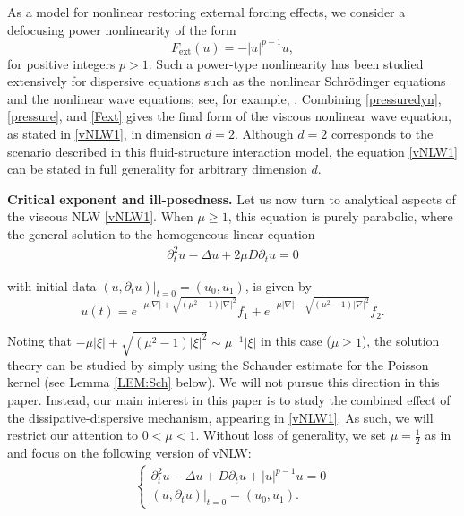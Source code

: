 \documentclass[letterpaper, 11pt,  reqno]{amsart}
\newcommand{\1}{\hspace{0.5mm}\text{I}\hspace{0.2mm}}
\newcommand{\noi}{\noindent}
\newcommand{\nb}{\nabla}
\newcommand{\Dl}{\Delta}
\newcommand{\dt}{\partial_t}
\numberwithin{equation}{section}
\numberwithin{theorem}{section}
\begin{document}
As a model for nonlinear restoring external forcing effects, we consider a defocusing power nonlinearity of the form
\begin{equation}\label{Fext}
F_{\text{ext}}(u) = -|u|^{p - 1} u,
\end{equation}
for positive integers $p > 1$.
Such a power-type nonlinearity has been studied extensively 
for dispersive equations
 such as the nonlinear Schr\"{o}dinger equations and the nonlinear wave equations; see, for example, \cite{TAO}. Combining \eqref{pressuredyn}, \eqref{pressure}, and \eqref{Fext} gives the final form of the viscous nonlinear wave equation, as stated in \eqref{vNLW1}, in dimension $d = 2$. Although $d = 2$ corresponds 
 to the scenario described in this fluid-structure interaction model, the equation \eqref{vNLW1} can be stated in full generality for arbitrary dimension $d$. 


\medskip

{\bf{Critical exponent and ill-posedness.}} Let us now turn to analytical aspects of the viscous NLW \eqref{vNLW1}.
When $\mu \geq 1$, this equation is purely parabolic, 
where the general solution to the homogeneous linear equation
\begin{align*}
\dt^2 u - \Dl  u  + 2\mu D \dt u  = 0
\end{align*}

\noi
with initial data $(u, \partial_{t}u)|_{t = 0} = (u_{0}, u_{1})$, is given by 
\[ u(t) =  e^{-\mu|\nb| + \sqrt{(\mu^2 - 1) |\nb|^2}}
f_1 + e^{-\mu|\nb| - \sqrt{(\mu^2 - 1) |\nb|^2}} f_2.
\]

\noi
Noting that $-\mu |\xi|  + \sqrt{(\mu^2 - 1) |\xi|^2}\sim \mu^{-1} |\xi|$
in this case ($\mu \ge 1$), the solution theory can be studied by 
simply using the Schauder estimate
for the Poisson kernel (see Lemma \ref{LEM:Sch} below).
We will not pursue this direction in this paper.
Instead, 
our main interest in this paper is to study the 
combined effect of the dissipative-dispersive mechanism, 
appearing in \eqref{vNLW1}.
As such, we will restrict our attention to $0 < \mu < 1$.
Without loss of generality, 
we set $\mu = \frac 12$ as in \cite{KC}
and focus on the following version of vNLW:
\begin{align}
\begin{cases}
\dt^2 u - \Dl  u  + D \dt u  + |u|^{p-1} u = 0\\
(u, \dt u) |_{t = 0} = (u_0, u_1).
\end{cases}
\label{vNLW1b}
\end{align}
\end{document}
